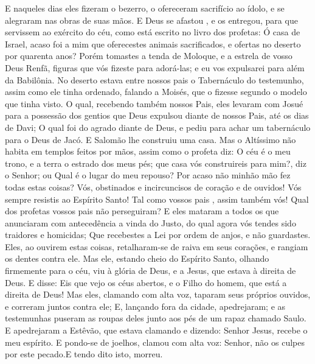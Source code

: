 {E naqueles dias eles fizeram o bezerro, o ofereceram sacrifício ao ídolo, e se alegraram nas obras de suas
{} mãos.
E Deus se afastou{} , e os entregou, para que servissem ao exército do céu, como está escrito no livro dos profetas: Ó casa de Israel, acaso foi a mim que oferecestes animais sacrificados, e ofertas no deserto por quarenta anos?
Porém tomastes
{} a tenda de Moloque, e a estrela de vosso Deus Renfã, figuras que vós fizeste para adorá-las; e eu
{} vos expulsarei para além da Babilônia.
No deserto estava entre nossos pais o Tabernáculo do testemunho, assim como ele tinha ordenado, falando a Moisés, que o fizesse segundo o modelo que tinha visto.
O qual, recebendo
{} também nossos Pais, eles levaram com Josué para a possessão dos gentios que Deus expulsou diante de nossos Pais, até os dias de Davi;
O qual foi do agrado diante de Deus, e pediu para achar um tabernáculo para o Deus de Jacó.
E Salomão lhe construiu uma casa.
Mas o Altíssimo não habita em templos feitos por mãos, assim como o profeta diz:
O céu é o meu trono, e a terra
{} o estrado dos meus pés; que casa vós construireis para mim?, diz o Senhor; ou Qual é o lugar do meu repouso?
Por acaso não
{} minhão mão
{} fez todas estas coisas?
Vós, obstinados e incircuncisos de coração e de ouvidos! Vós sempre resistis ao Espírito Santo! Tal como vossos pais
{} , assim também
{} vós!
Qual dos profetas vossos pais não perseguiram? E eles mataram a todos os que anunciaram com antecedência a vinda do Justo, do qual agora vós tendes sido traidores e homicidas;
Que recebestes a Lei por ordem de anjos, e não
{} guardastes.
Eles, ao ouvirem estas coisas, retalharam-se de raiva em seus corações, e rangiam os dentes contra ele.
Mas ele, estando cheio do Espírito Santo, olhando firmemente para o céu, viu à glória de Deus, e a Jesus, que estava à direita de Deus.
E disse: Eis que vejo os céus abertos, e o Filho do homem, que está a direita de Deus!
Mas eles, clamando com alta voz, taparam seus próprios ouvidos, e correram juntos contra ele;
E, lançando
{} fora da cidade,
{} apedrejaram; e as testemunhas puseram as roupas deles junto aos pés de um rapaz chamado Saulo.
E apedrejaram a Estêvão, que estava clamando e dizendo: Senhor Jesus, recebe o meu espírito.
E pondo-se de joelhos, clamou com alta voz: Senhor, não os culpes por este pecado.E tendo dito isto, morreu.

}
